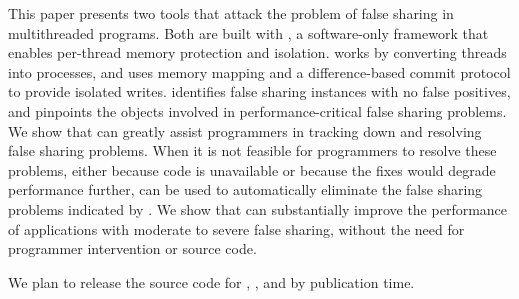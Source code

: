 \label{sec:conclusion}
This paper presents two tools that attack the problem of false sharing
in multithreaded programs. Both are built with \sheriff{}, a
software-only framework that enables per-thread memory protection and
isolation. \sheriff{} works by converting threads into processes, and
uses memory mapping and a difference-based commit protocol to provide
isolated writes. \sheriffdetect{} identifies false sharing instances
with no false positives, and pinpoints the objects involved in
performance-critical false sharing problems. We show
that \sheriffdetect{} can greatly assist programmers in tracking down
and resolving false sharing problems. When it is not feasible for
programmers to resolve these problems, either because code is
unavailable or because the fixes would degrade performance
further, \sheriffprotect{} can be used to automatically eliminate the
false sharing problems indicated by \sheriffdetect{}. We show
that \sheriffprotect{} can substantially improve the performance of
applications with moderate to severe false sharing, without the need
for programmer intervention or source code.

We plan to release the source code for \sheriff{}, \sheriffdetect{},
and \sheriffprotect{} by publication time.
